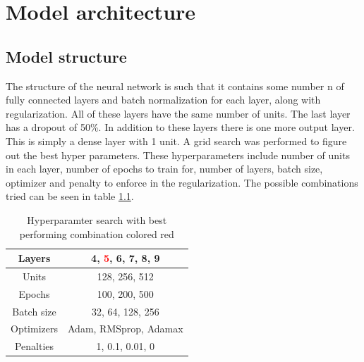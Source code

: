 
\chapter{Model architecture} %

\label{Chapter4} %


\section{Model structure}
The structure of the neural network is such that it contains some number n of  fully connected layers and batch normalization for each layer, along with regularization. All of these layers have the same number of units. The last layer has a dropout of 50\%. In addition to these layers there is one more output layer. This is simply a dense layer with 1 unit. A grid search was performed to figure out the best hyper parameters. These hyperparameters include number of units in each layer, number of epochs to train for, number of layers, batch size, optimizer and penalty to enforce in the regularization. The possible combinations tried can be seen in table \ref{table:gridSearchHyperparamters}.

\begin{table}[h]
    \centering
    \begin{tabular}{c|c}
        Layers &  4, \textcolor{red}{5}, 6, 7, 8, 9\\\hline
        Units &  128, 256, 512\\\hline
        Epochs & 100, 200, 500\\\hline
        Batch size & 32, 64, 128, 256\\\hline
        Optimizers & Adam, RMSprop, Adamax\\\hline
        Penalties & 1, 0.1, 0.01, 0\\\hline
    \end{tabular}
    \caption{Hyperparamter search with best performing combination colored red}
    \label{table:gridSearchHyperparamters}
\end{table}

